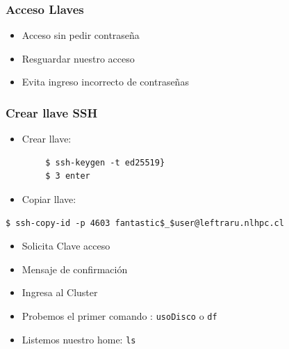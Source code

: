 \documentclass[aspectratio=169,professionalfonts]{beamer}
\begin{document}
\begin{frame}[fragile]
\frametitle{\textbf{Acceso Llaves}}
\begin{itemize}
    \item Acceso sin pedir contraseña
            \vspace{0.5em} 

    \item Resguardar nuestro acceso 
            \vspace{0.5em} 

    \item Evita ingreso incorrecto de contraseñas
    
\end{itemize}
    
\end{frame}

\begin{frame} [fragile]
\frametitle{\textbf{Crear llave SSH}}
\begin{itemize}
    \item Crear llave:
    \end{itemize}
    \begin{verbatim}
        $ ssh-keygen -t ed25519} 
        $ 3 enter
    \end{verbatim}
    
    \begin{itemize}
        \item Copiar llave:
    \end{itemize}

\begin{verbatim}
$ ssh-copy-id -p 4603 fantastic$_$user@leftraru.nlhpc.cl
    \end{verbatim}
\begin{itemize}
    \item Solicita Clave acceso
    \item Mensaje de confirmación
\item Ingresa al Cluster 
\item Probemos el primer comando : \texttt{usoDisco} o \texttt{df}
\item Listemos nuestro home: \texttt{ls}

    \end{itemize}
\end{frame}
\end{document}
